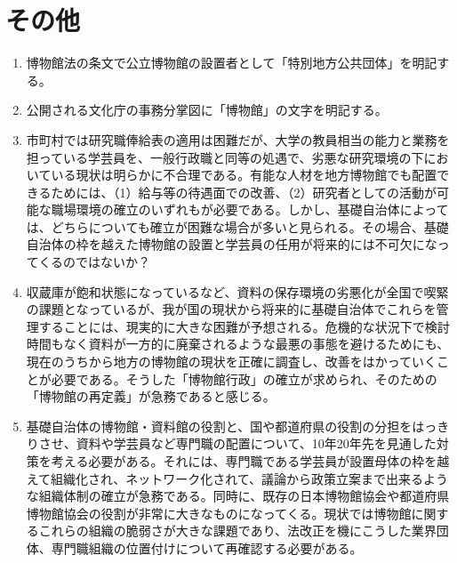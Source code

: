 \documentclass[12pt]{jsarticle}
\begin{document}
\section{その他}
\begin{enumerate}
	\item 博物館法の条文で公立博物館の設置者として「特別地方公共団体」を明記する。
	\item 公開される文化庁の事務分掌図に「博物館」の文字を明記する。
	\item 市町村では研究職俸給表の適用は困難だが、大学の教員相当の能力と業務を担っている学芸員を、一般行政職と同等の処遇で、劣悪な研究環境の下においている現状は明らかに不合理である。有能な人材を地方博物館でも配置できるためには、（1）給与等の待遇面での改善、（2）研究者としての活動が可能な職場環境の確立のいずれもが必要である。しかし、基礎自治体によっては、どちらについても確立が困難な場合が多いと見られる。その場合、基礎自治体の枠を越えた博物館の設置と学芸員の任用が将来的には不可欠になってくるのではないか？
	\item 収蔵庫が飽和状態になっているなど、資料の保存環境の劣悪化が全国で喫緊の課題となっているが、我が国の現状から将来的に基礎自治体でこれらを管理することには、現実的に大きな困難が予想される。危機的な状況下で検討時間もなく資料が一方的に廃棄されるような最悪の事態を避けるためにも、現在のうちから地方の博物館の現状を正確に調査し、改善をはかっていくことが必要である。そうした「博物館行政」の確立が求められ、そのための「博物館の再定義」が急務であると感じる。
	\item 基礎自治体の博物館・資料館の役割と、国や都道府県の役割の分担をはっきりさせ、資料や学芸員など専門職の配置について、10年20年先を見通した対策を考える必要がある。それには、専門職である学芸員が設置母体の枠を越えて組織化され、ネットワーク化されて、議論から政策立案まで出来るような組織体制の確立が急務である。同時に、既存の日本博物館協会や都道府県博物館協会の役割が非常に大きなものになってくる。現状では博物館に関するこれらの組織の脆弱さが大きな課題であり、法改正を機にこうした業界団体、専門職組織の位置付けについて再確認する必要がある。	
\end{enumerate}
\end{document}
